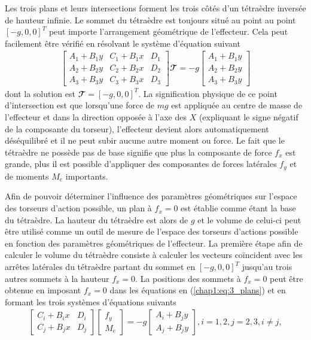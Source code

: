 
Les trois plans et leurs intersections forment les trois côtés d'un tétraèdre inversée de hauteur infinie. Le sommet du tétraèdre est toujours situé au point au point $[-g,0,0]^T$ peut importe l'arrangement géométrique de l'effecteur. Cela peut facilement être vérifié en résolvant le système d'équation suivant
\begin{align}
\begin{bmatrix}
A_1+B_1y & C_1+B_1x & D_1 \\
A_2+B_2y & C_2+B_2x & D_2 \\
A_3+B_3y & C_3+B_3x & D_3
\end{bmatrix}
\mathbfcal{T}
= -g
\begin{bmatrix}
A_1+B_1y\\
A_2+B_2y\\
A_3+B_3y
\end{bmatrix}
\end{align} dont la solution est $\mathbfcal{T} = [-g, 0, 0]^T$. La signification physique de ce point d'intersection est que lorsqu'une force de $mg$ est appliquée au centre de masse de l'effecteur et dans la direction opposée à l'axe des $X$ (expliquant le signe négatif de la composante du torseur), l'effecteur devient alors automatiquement déséquilibré et il ne peut subir aucune autre moment ou force. Le fait que le tétraèdre ne possède pas de base signifie que plus la composante de force $f_x$ est grande, plus il est possible d'appliquer des composantes de forces latérales $f_y$ et de moments $M_e$ importants. \par
Afin de pouvoir déterminer l'influence des paramètres géométriques sur l'espace des torseurs d'action possible, un plan à $f_x=0$ est établie comme étant la base du tétraèdre. La hauteur du tétraèdre est alors de $g$ et le volume de celui-ci peut être utilisé comme un outil de mesure de l'espace des torseurs d'actions possible en fonction des paramètres géométriques de l'effecteur. La première étape afin de calculer le volume du tétraèdre consiste à calculer les vecteurs coïncident avec les arrêtes latérales du tétraèdre partant du sommet en $[-g, 0, 0]^T$ jusqu'au trois autres sommets à la hauteur $f_x=0$. La positions des sommets à $f_x=0$ peut être obtenue en imposant $f_x=0$ dans les équations en (\ref{chap1:eq:3_plans}) et en formant les trois systèmes d'équations suivants
\begin{align}
\begin{bmatrix}
C_i+B_ix & D_i \\
C_j+B_jx & D_j
\end{bmatrix}
\begin{bmatrix}
f_y \\ M_e
\end{bmatrix} = -g \begin{bmatrix}
A_i+B_jy\\
A_j+B_jy
\end{bmatrix}, i=1,2, j=2,3, i\neq j,
\end{align}

